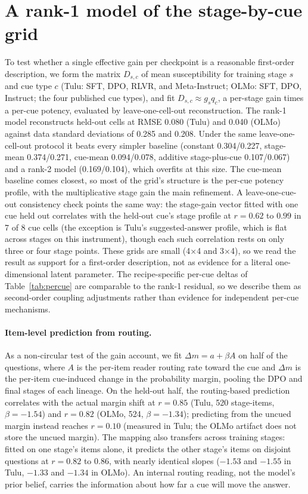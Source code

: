 \documentclass{article}
\begin{document}
\section{A rank-1 model of the stage-by-cue grid}
\label{app:rank}
To test whether a single effective gain per checkpoint is a reasonable first-order description, we form the matrix $D_{s,c}$ of mean susceptibility for training stage $s$ and cue type $c$ (Tulu: SFT, DPO, RLVR, and Meta-Instruct; OLMo: SFT, DPO, Instruct; the four published cue types), and fit $D_{s,c}\approx g_s q_c$, a per-stage gain times a per-cue potency, evaluated by leave-one-cell-out reconstruction. The rank-1 model reconstructs held-out cells at RMSE 0.080 (Tulu) and 0.040 (OLMo) against data standard deviations of 0.285 and 0.208. Under the same leave-one-cell-out protocol it beats every simpler baseline (constant 0.304/0.227, stage-mean 0.374/0.271, cue-mean 0.094/0.078, additive stage-plus-cue 0.107/0.067) and a rank-2 model (0.169/0.104), which overfits at this size. The cue-mean baseline comes closest, so most of the grid's structure is the per-cue potency profile, with the multiplicative stage gain the main refinement. A leave-one-cue-out consistency check points the same way: the stage-gain vector fitted with one cue held out correlates with the held-out cue's stage profile at $r=0.62$ to $0.99$ in 7 of 8 cue cells (the exception is Tulu's suggested-answer profile, which is flat across stages on this instrument), though each such correlation rests on only three or four stage points. These grids are small (4$\times$4 and 3$\times$4), so we read the result as support for a first-order description, not as evidence for a literal one-dimensional latent parameter. The recipe-specific per-cue deltas of Table~\ref{tab:percue} are comparable to the rank-1 residual, so we describe them as second-order coupling adjustments rather than evidence for independent per-cue mechanisms.

\paragraph{Item-level prediction from routing.} As a non-circular test of the gain account, we fit $\Delta m = a + \beta A$ on half of the questions, where $A$ is the per-item reader routing rate toward the cue and $\Delta m$ is the per-item cue-induced change in the probability margin, pooling the DPO and final stages of each lineage. On the held-out half, the routing-based prediction correlates with the actual margin shift at $r=0.85$ (Tulu, 520 stage-items, $\beta=-1.54$) and $r=0.82$ (OLMo, 524, $\beta=-1.34$); predicting from the uncued margin instead reaches $r=0.10$ (measured in Tulu; the OLMo artifact does not store the uncued margin). The mapping also transfers across training stages: fitted on one stage's items alone, it predicts the other stage's items on disjoint questions at $r=0.82$ to $0.86$, with nearly identical slopes ($-1.53$ and $-1.55$ in Tulu, $-1.33$ and $-1.34$ in OLMo). An internal routing reading, not the model's prior belief, carries the information about how far a cue will move the answer.
\end{document}
